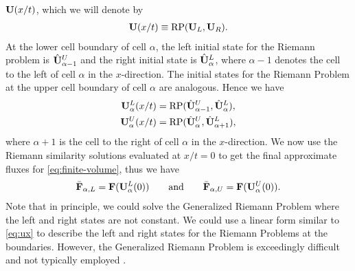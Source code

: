 \documentclass{article}
\begin{document}
$\mathrm{\bf U}(x/t)$, which we will denote by
\begin{align}
  \label{eq:RP-notation}
  \mathrm{\bf U}(x/t) \equiv \text{RP}(\mathrm{\bf U}_L, \mathrm{\bf U}_R).
\end{align}
At the lower cell boundary of cell $\alpha$, the left initial state for the Riemann problem is
$\hat{\mathrm{\bf U}}_{\alpha-1}^U$ and the right initial state is $\hat{\mathrm{\bf U}}_\alpha^L$, where $\alpha -1$
denotes the cell to the left of cell $\alpha$ in the $x$-direction. The initial states for the
Riemann Problem at the upper cell boundary of cell $\alpha$ are analogous. Hence we have
\begin{align}
  \label{eq:RPs-1d}
  \mathrm{\bf U}_\alpha^L(x/t) &= \text{RP}(\hat{\mathrm{\bf U}}_{\alpha-1}^U, \hat{\mathrm{\bf U}}_\alpha^L), \nonumber \\
  \mathrm{\bf U}_\alpha^U(x/t) &= \text{RP}(\hat{\mathrm{\bf U}}_\alpha^U, \hat{\mathrm{\bf U}}_{\alpha+1}^L),
\end{align}
where $\alpha+1$ is the cell to the right of cell $\alpha$ in the $x$-direction. We now use the
Riemann similarity solutions evaluated at $x/t = 0$ to get the final approximate fluxes for
\cref{eq:finite-volume}, thus we have
\begin{align}
  \label{eq:fluxes-1d}
  \bar{\mathrm{\bf F}}_{\alpha,L} = \mathrm{\bf F}(\mathrm{\bf U}_\alpha^L(0)) \qquad \text{and} \qquad
  \bar{\mathrm{\bf F}}_{\alpha,U} = \mathrm{\bf F}(\mathrm{\bf U}_\alpha^U(0)).
\end{align}
Note that in principle, we could solve the Generalized Riemann Problem where the left and right
states are not constant. We could use a linear form similar to \cref{eq:ux} to describe the left and
right states for the Riemann Problems at the boundaries. However, the Generalized Riemann Problem is
exceedingly difficult and not typically employed \cite[\S13.4.1]{toro}.
\end{document}
